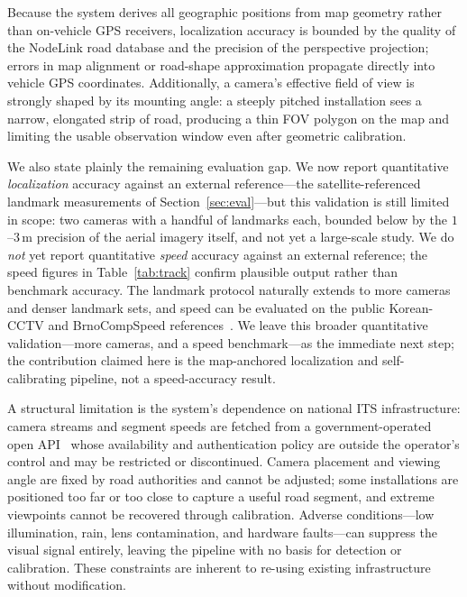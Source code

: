 \documentclass[conference]{IEEEtran}
\renewcommand{\_}{\textunderscore\allowbreak}
\begin{document}
Because the system derives all geographic positions from map geometry rather than
on-vehicle GPS receivers, localization accuracy is bounded by the quality of the
NodeLink road database and the precision of the perspective projection; errors in
map alignment or road-shape approximation propagate directly into vehicle GPS
coordinates. Additionally, a camera's effective field of view is strongly shaped by
its mounting angle: a steeply pitched installation sees a narrow, elongated strip of
road, producing a thin FOV polygon on the map and limiting the usable observation
window even after geometric calibration.

We also state plainly the remaining evaluation gap. We now report quantitative
\emph{localization} accuracy against an external reference---the satellite-referenced
landmark measurements of Section~\ref{sec:eval}---but this validation is still
limited in scope: two cameras with a handful of landmarks each, bounded below by the
$1$--$3$\,m precision of the aerial imagery itself, and not yet a large-scale study.
We do \emph{not} yet report quantitative \emph{speed} accuracy against an external
reference; the speed figures in Table~\ref{tab:track} confirm plausible output rather
than benchmark accuracy. The landmark protocol naturally extends to more cameras and
denser landmark sets, and speed can be evaluated on the public Korean-CCTV and
BrnoCompSpeed references~\cite{revaud2021,sochor2019}. We leave this broader
quantitative validation---more cameras, and a speed benchmark---as the immediate next
step; the contribution claimed here is the map-anchored localization and
self-calibrating pipeline, not a speed-accuracy result.

A structural limitation is the system's dependence on national ITS
infrastructure: camera streams and segment speeds are fetched from a
government-operated open API~\cite{its_openapi} whose availability and
authentication policy are outside the operator's control and may be
restricted or discontinued. Camera placement and viewing angle are fixed by
road authorities and cannot be adjusted; some installations are positioned
too far or too close to capture a useful road segment, and extreme viewpoints
cannot be recovered through calibration. Adverse conditions---low
illumination, rain, lens contamination, and hardware faults---can suppress
the visual signal entirely, leaving the pipeline with no basis for detection
or calibration. These constraints are inherent to re-using existing
infrastructure without modification.
\end{document}
